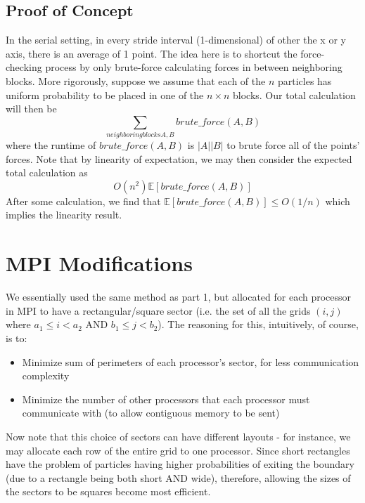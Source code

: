 \documentclass[12pt]{article}
\begin{document}
\subsection{Proof of Concept} In the serial setting, in every stride interval (1-dimensional) of other the x or y axis, there is an average of 1 point. The idea here is to shortcut the force-checking process by only brute-force calculating forces in between neighboring blocks.  More rigorously, suppose we assume that each of the $n$ particles has uniform probability to be placed in one of the $n \times n$ blocks. Our total calculation will then be $$\sum_{neighboring blocks A, B}  brute\_force(A, B)$$ where the runtime of $brute\_force(A,B)$ is $|A||B|$ to brute force all of the points' forces. Note that by linearity of expectation, we may then consider the expected total calculation as $$O(n^{2}) \mathbb{E} \left[brute\_force(A,B) \right]$$
After some calculation, we find that $\mathbb{E} \left[brute\_force(A,B) \right] \le O(1/n)$ which implies the linearity result. 

\section{MPI Modifications}
We essentially used the same method as part 1, but allocated for each processor in MPI to have a rectangular/square sector (i.e. the set of all the grids $(i,j)$ where $a_{1} \le i < a_{2}$ AND $b_{1} \le j < b_{2}$). The reasoning for this, intuitively, of course, is to: \begin{itemize} \item Minimize sum of perimeters of each processor's sector, for less communication complexity \item Minimize the number of other processors that each processor must communicate with (to allow contiguous memory to be sent) \end{itemize} Now note that this choice of sectors can have different layouts - for instance, we may allocate each row of the entire grid to one processor. Since short rectangles have the problem of particles having higher probabilities of exiting the boundary (due to a rectangle being both short AND wide), therefore, allowing the sizes of the sectors to be squares become most efficient. 
\end{document}
